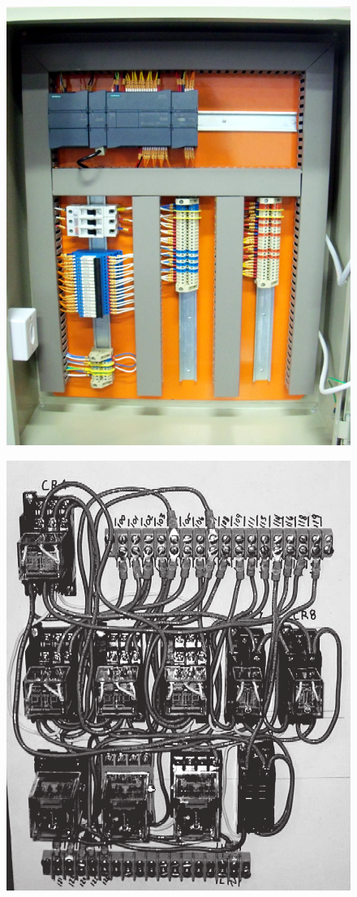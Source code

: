 \documentclass[a4paper, 12pt]{article}
\begin{document}
		\begin{figure}[H]
			\centering
			\begin{minipage}{.5\textwidth}
			  \centering
			  \includegraphics[width=.65\linewidth]{figures/CLPControlPanel.png}
			  \label{fig:clp-control-panel}
			\end{minipage}%
			\begin{minipage}{.5\textwidth}
			  \centering
			  \includegraphics[width=.65\linewidth]{figures/ReleControlPanel.png}
			  \label{fig:rele-control-panel}
			\end{minipage}
		\end{figure}
	
\end{document}

